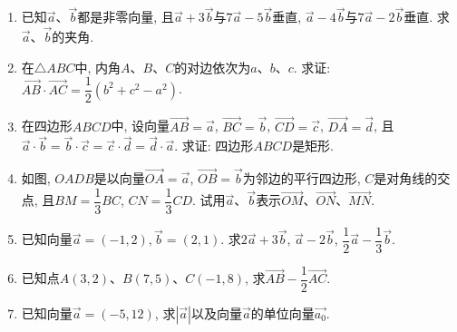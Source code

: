 \documentclass[10pt,a4paper]{article}
\begin{document}
\begin{enumerate}[1.]
\item 已知$\overrightarrow a$、$\overrightarrow b$都是非零向量, 且$\overrightarrow a+3\overrightarrow b$与$7\overrightarrow a-5\overrightarrow b$垂直, $\overrightarrow a-4\overrightarrow b$与$7\overrightarrow a-2\overrightarrow b$垂直. 求$\overrightarrow a$、$
\overrightarrow b$的夹角.
\item 在$\triangle ABC$中, 内角$A$、$B$、$C$的对边依次为$a$、$b$、$c$. 求证: $\overrightarrow{AB}\cdot \overrightarrow{AC}=\dfrac 12(b^2+c^2-a^2)$.
\item 在四边形$ABCD$中, 设向量$\overrightarrow{AB}=\overrightarrow a$, $\overrightarrow{BC}=\overrightarrow b$, $\overrightarrow{CD}=\overrightarrow c$, $\overrightarrow{DA}=\overrightarrow d$, 且$\overrightarrow a\cdot \overrightarrow b=\overrightarrow b\cdot
\overrightarrow c=\overrightarrow c\cdot \overrightarrow d=\overrightarrow d\cdot \overrightarrow a$. 求证: 四边形$ABCD$是矩形.
\item 如图, $OADB$是以向量$\overrightarrow{OA}=\overrightarrow a$, $\overrightarrow{OB}=\overrightarrow b$为邻边的平行四边形, $C$是对角线的交点, 且$BM=\dfrac 13BC$, $CN=\dfrac 13CD$. 试用$\overrightarrow a$、$\overrightarrow b$表示$\overrightarrow{OM}$、$\overrightarrow{ON}$、$\overrightarrow{MN}$.
\begin{center}
\end{center}
\item 已知向量$\overrightarrow a=(-1, 2), \overrightarrow b=(2, 1)$. 求$2\overrightarrow a+3\overrightarrow b$, $\overrightarrow a-2\overrightarrow b$, $\dfrac 12\overrightarrow a-\dfrac 13\overrightarrow b$.
\item 已知点$A(3, 2)$、$B(7, 5)$、$C(-1, 8)$, 求$\overrightarrow{AB}-\dfrac 12\overrightarrow{AC}$.
\item 已知向量$\overrightarrow a=(-5, 12)$, 求$|\overrightarrow a|$以及向量$\overrightarrow a$的单位向量$\overrightarrow{a_0}$.

\end{enumerate}
\end{document}
